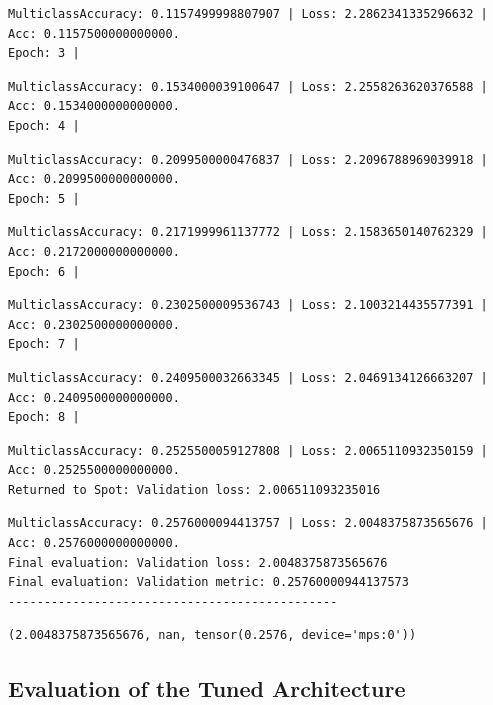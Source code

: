 \documentclass[
  letterpaper,
  DIV=11,
  numbers=noendperiod]{scrreprt}
\begin{document}
\begin{verbatim}
MulticlassAccuracy: 0.1157499998807907 | Loss: 2.2862341335296632 | Acc: 0.1157500000000000.
Epoch: 3 | 
\end{verbatim}

\begin{verbatim}
MulticlassAccuracy: 0.1534000039100647 | Loss: 2.2558263620376588 | Acc: 0.1534000000000000.
Epoch: 4 | 
\end{verbatim}

\begin{verbatim}
MulticlassAccuracy: 0.2099500000476837 | Loss: 2.2096788969039918 | Acc: 0.2099500000000000.
Epoch: 5 | 
\end{verbatim}

\begin{verbatim}
MulticlassAccuracy: 0.2171999961137772 | Loss: 2.1583650140762329 | Acc: 0.2172000000000000.
Epoch: 6 | 
\end{verbatim}

\begin{verbatim}
MulticlassAccuracy: 0.2302500009536743 | Loss: 2.1003214435577391 | Acc: 0.2302500000000000.
Epoch: 7 | 
\end{verbatim}

\begin{verbatim}
MulticlassAccuracy: 0.2409500032663345 | Loss: 2.0469134126663207 | Acc: 0.2409500000000000.
Epoch: 8 | 
\end{verbatim}

\begin{verbatim}
MulticlassAccuracy: 0.2525500059127808 | Loss: 2.0065110932350159 | Acc: 0.2525500000000000.
Returned to Spot: Validation loss: 2.006511093235016
\end{verbatim}

\begin{verbatim}
MulticlassAccuracy: 0.2576000094413757 | Loss: 2.0048375873565676 | Acc: 0.2576000000000000.
Final evaluation: Validation loss: 2.0048375873565676
Final evaluation: Validation metric: 0.25760000944137573
----------------------------------------------
\end{verbatim}

\begin{verbatim}
(2.0048375873565676, nan, tensor(0.2576, device='mps:0'))
\end{verbatim}

\hypertarget{evaluation-of-the-tuned-architecture}{%
\subsection{Evaluation of the Tuned
Architecture}\label{evaluation-of-the-tuned-architecture}}
\end{document}
